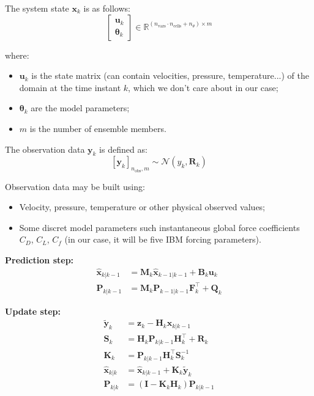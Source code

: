 The system state $\mathbf{x}_k$ is as follows:
\begin{equation}
\left[
\begin{array}{c}
\mathbf{u}_k \\
\boldsymbol{\theta}_k
\end{array}
\right]
\in \mathbb{R}^{(n_{\text{vars}} \cdot n_{\text{cells}} + n_{\theta}) \times m}
\end{equation}

where:
\begin{itemize}
    \item $\mathbf{u}_k$ is the state matrix (can contain velocities, pressure, temperature...) of the domain at the time instant $k$, which we don't care about in our case;
    \item $\boldsymbol{\theta}_k$ are the model parameters; %
    \item $m$ is the number of ensemble members.
\end{itemize}

The observation data $\mathbf{y}_k$ is defined as:
\begin{equation}
\left[ \mathbf{y}_k \right]_{n_{\text{obs}}, m} \sim \mathcal{N}(y_k, \mathbf{R}_k)
\end{equation}

Observation data may be built using:
\begin{itemize}
    \item Velocity, pressure, temperature or other physical observed values;
    \item Some discret model parameters such instantaneous global force coefficients $C_D$, $C_L$, $C_f$ (in our case, it will be five IBM forcing parameters).
\end{itemize}



\textbf{Prediction step:}
\begin{align}
    \hat{\mathbf{x}}_{k|k-1} &= \mathbf{M}_k \hat{\mathbf{x}}_{k-1|k-1} + \mathbf{B}_k \mathbf{u}_k \\
    \mathbf{P}_{k|k-1} &= \mathbf{M}_k \mathbf{P}_{k-1|k-1} \mathbf{F}_k^\top + \mathbf{Q}_k
\end{align}

\vspace{1em}
\textbf{Update step:}
\begin{align}
    \tilde{\mathbf{y}}_k &= \mathbf{z}_k - \mathbf{H}_k \hat{\mathbf{x}}_{k|k-1} \\
    \mathbf{S}_k &= \mathbf{H}_k \mathbf{P}_{k|k-1} \mathbf{H}_k^\top + \mathbf{R}_k \\
    \mathbf{K}_k &= \mathbf{P}_{k|k-1} \mathbf{H}_k^\top \mathbf{S}_k^{-1} \\
    \hat{\mathbf{x}}_{k|k} &= \hat{\mathbf{x}}_{k|k-1} + \mathbf{K}_k \tilde{\mathbf{y}}_k \\
    \mathbf{P}_{k|k} &= (\mathbf{I} - \mathbf{K}_k \mathbf{H}_k) \mathbf{P}_{k|k-1}
\end{align}

